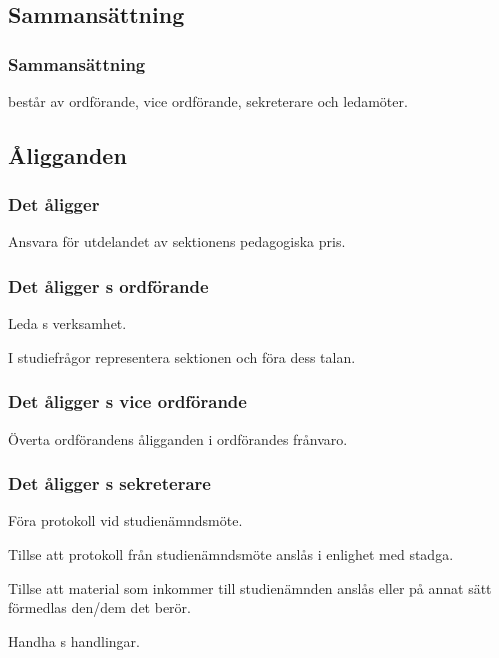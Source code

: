 \section{\SNITFULL}


\subsection{Sammansättning}
  
\subsubsection{Sammansättning}
\SNIT{} består av ordförande, vice ordförande, sekreterare och ledamöter.

\subsection{Åligganden}

\subsubsection{Det åligger \SNIT}

\begin{att}
	\item Ansvara för utdelandet av sektionens pedagogiska pris. 
\end{att}

\subsubsection{Det åligger \SNIT{}s ordförande}
\begin{att}
	\item Leda \SNIT{}s verksamhet.
	\item I studiefrågor representera sektionen och föra dess talan.
\end{att}

\subsubsection{Det åligger \SNIT{}s vice ordförande}
\begin{att}
	\item Överta ordförandens åligganden i ordförandes frånvaro.
\end{att}

\subsubsection{Det åligger \SNIT{}s sekreterare}
\begin{att}
	\item Föra protokoll vid studienämndsmöte.
	\item Tillse att protokoll från studienämndsmöte anslås i enlighet med stadga.
	\item Tillse att material som inkommer till studienämnden anslås eller på annat sätt förmedlas den/dem det berör.
	\item Handha \SNIT{}s handlingar.
\end{att}



